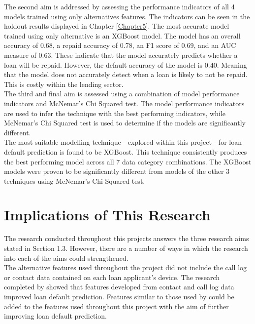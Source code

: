 The second aim is addressed by assessing the performance indicators of all 4 models trained using only alternatives features. The indicators can be seen in the holdout results displayed in Chapter \ref{Chapter5}. The most accurate model trained using only alternative is an XGBoost model. The model has an overall accuracy of 0.68, a repaid accuracy of 0.78, an F1 score of 0.69, and an AUC measure of 0.63. These indicate that the model accurately predicts whether a loan will be repaid. However, the default accuracy of the model is 0.40. Meaning that the model does not accurately detect when a loan is likely to not be repaid. This is costly within the lending sector. \\

The third and final aim is assessed using a combination of model performance indicators and McNemar's Chi Squared test. The model performance indicators are used to infer the technique with the best performing indicators, while McNemar's Chi Squared test is used to determine if the models are significantly different. \\

The most suitable modelling technique - explored within this project - for loan default prediction is found to be XGBoost. This technique consistently produces the best performing model across all 7 data category combinations. The XGBoost models were proven to be significantly different from models of the other 3 techniques using McNemar's Chi Squared test. 


\section{Implications of This Research}

The research conducted throughout this projects answers the three research aims stated in Section 1.3. However, there are a number of ways in which the research into each of the aims could  strengthened. \\

The alternative features used throughout the project did not include the call log or contact data contained on each loan applicant's device. The research completed by \textcite{BigDataMicroFiance} showed that features developed from contact and call log data improved loan default prediction. Features similar to those used by \textcite{BigDataMicroFiance} could be added to the features used throughout this project  with the aim of further improving loan default prediction. \\

